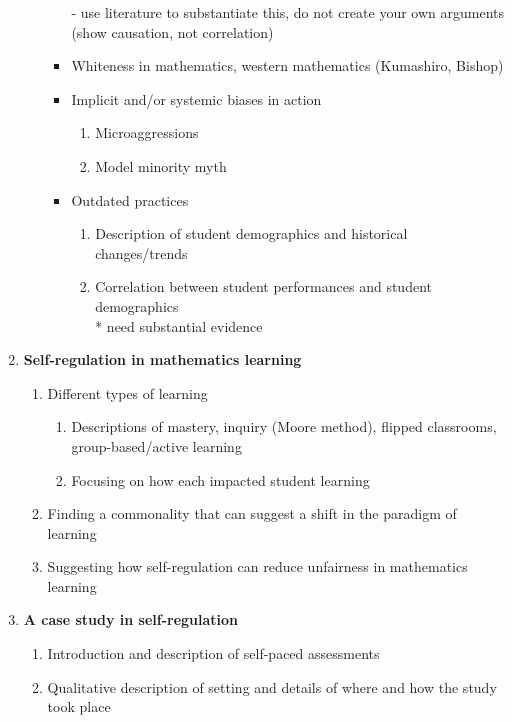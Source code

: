 \begin{enumerate}
\begin{enumerate}
\begin{itemize}
          - use literature to substantiate this, do not create your own arguments (show causation, not correlation)
          \item Whiteness in mathematics, western mathematics (Kumashiro, Bishop)
          \item Implicit and/or systemic biases in action
          \begin{enumerate}
            \item Microaggressions
            \item Model minority myth
          \end{enumerate}
          \item Outdated practices
          \begin{enumerate}
            \item Description of student demographics and historical changes/trends
            \item Correlation between student performances and student demographics
            \\ * need substantial evidence
          \end{enumerate}
    \end{itemize}
  \end{enumerate}
    \item{\bf Self-regulation in mathematics learning}
    \begin{enumerate}
      \item Different types of learning
      \begin{enumerate}
        \item Descriptions of mastery, inquiry (Moore method), flipped classrooms, group-based/active learning
        \item Focusing on how each impacted student learning
      \end{enumerate}
      \item Finding a commonality that can suggest a shift in the paradigm of learning
      \item Suggesting how self-regulation can reduce unfairness in mathematics learning
    \end{enumerate}
    \item {\bf A case study in self-regulation}
    \begin{enumerate}
      \item Introduction and description of self-paced assessments
      \item Qualitative description of setting and details of where and how the study took place

\end{enumerate}
\end{enumerate}

